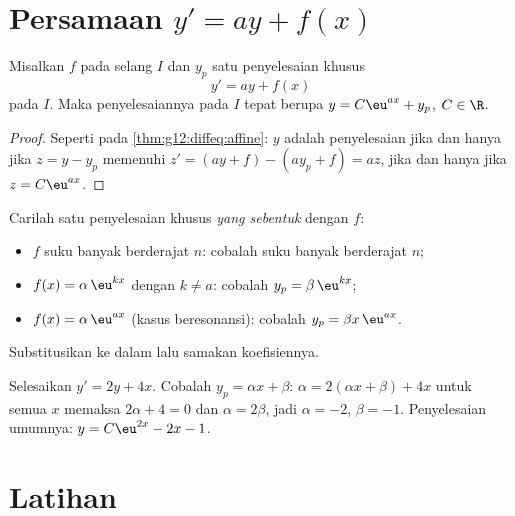 \section{Persamaan \texorpdfstring{$y' = ay + f(x)$}{y' = ay + f(x)}}

\begin{proposition}\label{prop:g12:diffeq:general}
Misalkan $f$  pada selang $I$ dan $y_p$ satu penyelesaian khusus
\[
y' = ay + f(x)
\]
pada $I$. Maka penyelesaiannya pada $I$ tepat berupa 
$y = C\eu^{ax} + y_p$, $C \in \R$.
\end{proposition}

\begin{proof}
Seperti pada \cref{thm:g12:diffeq:affine}: $y$ adalah penyelesaian jika dan hanya
jika $z = y - y_p$ memenuhi
$z' = (ay + f) - (ay_p + f) = az$, jika dan hanya jika $z = C\eu^{ax}$.
\end{proof}

\begin{method}\label{met:g12:diffeq:particular}
Carilah satu penyelesaian khusus \emph{yang sebentuk} dengan $f$:
\begin{itemize}
  \item $f$ suku banyak berderajat $n$: cobalah suku banyak berderajat $n$;
  \item $f(x) = \alpha\,\eu^{kx}$ dengan $k \neq a$: cobalah $y_p = \beta\,\eu^{kx}$;
  \item $f(x) = \alpha\,\eu^{ax}$ (kasus beresonansi): cobalah
        $y_p = \beta x\,\eu^{ax}$.
\end{itemize}
Substitusikan ke dalam  lalu samakan koefisiennya.
\end{method}

\begin{example}\label{ex:g12:diffeq:particular}
Selesaikan $y' = 2y + 4x$. Cobalah $y_p = \alpha x + \beta$:
$\alpha = 2(\alpha x + \beta) + 4x$ untuk semua $x$ memaksa
$2\alpha + 4 = 0$ dan $\alpha = 2\beta$, jadi $\alpha = -2$, $\beta = -1$.
Penyelesaian umumnya: $y = C\eu^{2x} - 2x - 1$.
\end{example}

\section{Latihan}

